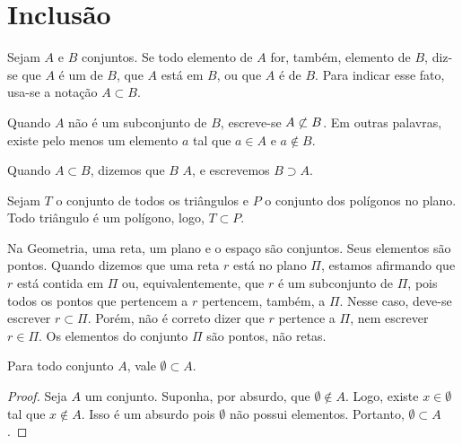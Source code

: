\section{Inclusão}

\begin{definition}
Sejam $A$ e $B$ conjuntos. Se todo elemento de $A$ for, também, elemento de $B$, diz-se que $A$ é um  de $B$, que $A$ está  em $B$, ou que $A$ é  de $B$. Para indicar esse fato, usa-se a notação $A \subset B$.
\end{definition}

\begin{remark}
Quando $A$ não é um subconjunto de $B$, escreve-se $A \not\subset B$. Em outras palavras, existe pelo menos um elemento $a$ tal que $a \in A$ e $a \notin B$.
\end{remark}

\begin{definition}
Quando $A \subset B$, dizemos que $B$  $A$, e escrevemos $B \supset A$.
\end{definition}

\begin{example}
Sejam $T$ o conjunto de todos os triângulos e $P$ o conjunto dos polígonos no plano. Todo triângulo é um polígono, logo, $T \subset P$.
\end{example}

\begin{example}
Na Geometria, uma reta, um plano e o espaço são conjuntos. Seus
elementos são pontos. Quando dizemos que uma reta $r$ está no plano $\Pi$, estamos afirmando que $r$ está contida em $\Pi$ ou, equivalentemente, que $r$ é um subconjunto de $\Pi$, pois todos os pontos que pertencem a $r$ pertencem, também, a $\Pi$. Nesse caso, deve-se escrever $ r \subset \Pi$. Porém, não é correto dizer que $r$ pertence a $\Pi$, nem escrever $r \in \Pi$. Os
elementos do conjunto $\Pi$ são pontos, não retas.
\end{example}

\begin{proposition}
Para todo conjunto $A$, vale $\emptyset \subset A$.
\end{proposition}

\begin{proof}
Seja $A$ um conjunto. Suponha, por absurdo, que $\emptyset \notin A$. Logo, existe $x \in \emptyset$ tal que $x \notin A$. Isso é um absurdo pois $\emptyset$ não possui elementos. Portanto, $\emptyset \subset A$.
\end{proof}

